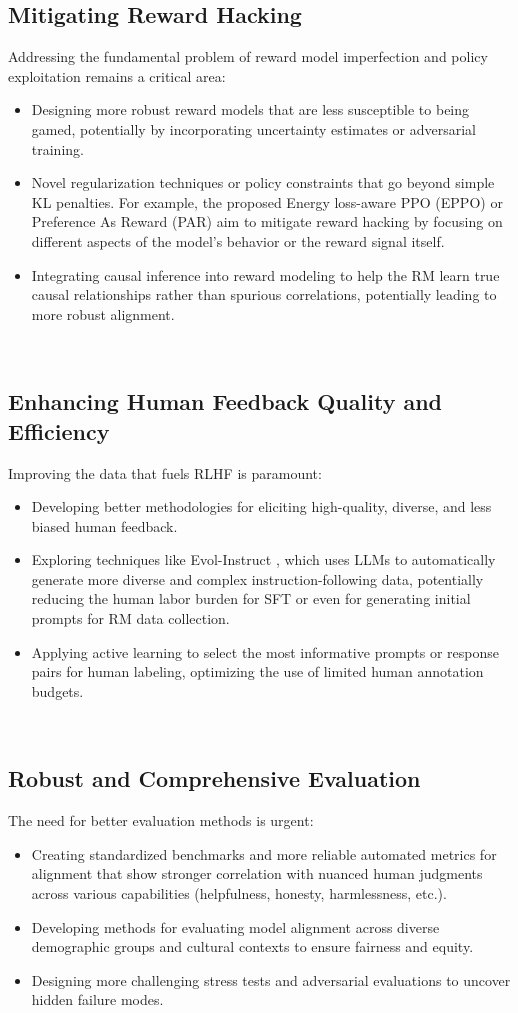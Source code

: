 \documentclass[10pt,journal,compsoc]{IEEEtran} %
\begin{document}
\subsection{Mitigating Reward Hacking}
Addressing the fundamental problem of reward model imperfection and policy exploitation remains a critical area:
\begin{itemize}
\item Designing more robust reward models that are less susceptible to being gamed, potentially by incorporating uncertainty estimates or adversarial training.
\item Novel regularization techniques or policy constraints that go beyond simple KL penalties. For example, the proposed Energy loss-aware PPO (EPPO)  or Preference As Reward (PAR)  aim to mitigate reward hacking by focusing on different aspects of the model's behavior or the reward signal itself.
\item Integrating causal inference into reward modeling to help the RM learn true causal relationships rather than spurious correlations, potentially leading to more robust alignment.
\end{itemize}  

\subsection{Enhancing Human Feedback Quality and Efficiency}
Improving the data that fuels RLHF is paramount:
\begin{itemize}
\item Developing better methodologies for eliciting high-quality, diverse, and less biased human feedback.
\item Exploring techniques like Evol-Instruct , which uses LLMs to automatically generate more diverse and complex instruction-following data, potentially reducing the human labor burden for SFT or even for generating initial prompts for RM data collection.
\item Applying active learning to select the most informative prompts or response pairs for human labeling, optimizing the use of limited human annotation budgets.
\end{itemize}  

\subsection{Robust and Comprehensive Evaluation}
The need for better evaluation methods is urgent:
\begin{itemize}
\item Creating standardized benchmarks and more reliable automated metrics for alignment that show stronger correlation with nuanced human judgments across various capabilities (helpfulness, honesty, harmlessness, etc.).
\item Developing methods for evaluating model alignment across diverse demographic groups and cultural contexts to ensure fairness and equity.
\item Designing more challenging stress tests and adversarial evaluations to uncover hidden failure modes.
\end{itemize}  
\end{document}
